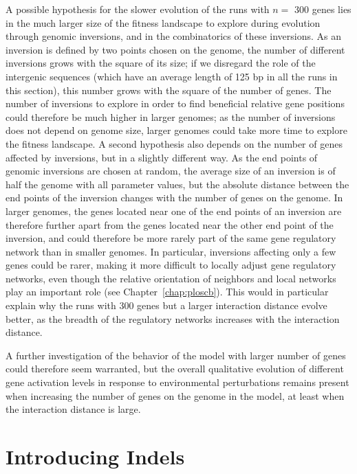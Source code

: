 A possible hypothesis for the slower evolution of the runs with $n =$ 300 genes lies in the much larger size of the fitness landscape to explore during evolution through genomic inversions, and in the combinatorics of these inversions.
As an inversion is defined by two points chosen on the genome, the number of different inversions grows with the square of its size; if we disregard the role of the intergenic sequences (which have an average length of 125 bp in all the runs in this section), this number grows with the square of the number of genes.
The number of inversions to explore in order to find beneficial relative gene positions could therefore be much higher in larger genomes; as the number of inversions does not depend on genome size, larger genomes could take more time to explore the fitness landscape.
A second hypothesis also depends on the number of genes affected by inversions, but in a slightly different way.
As the end points of genomic inversions are chosen at random, the average size of an inversion is of half the genome with all parameter values, but the absolute distance between the end points of the inversion changes with the number of genes on the genome.
In larger genomes, the genes located near one of the end points of an inversion are therefore further apart from the genes located near the other end point of the inversion, and could therefore be more rarely part of the same gene regulatory network than in smaller genomes.
In particular, inversions affecting only a few genes could be rarer, making it more difficult to locally adjust gene regulatory networks, even though the relative orientation of neighbors and local networks play an important role (see Chapter~\ref{chap:ploscb}).
This would in particular explain why the runs with 300 genes but a larger interaction distance evolve better, as the breadth of the regulatory networks increases with the interaction distance.

A further investigation of the behavior of the model with larger number of genes could therefore seem warranted, but the overall qualitative evolution of different gene activation levels in response to environmental perturbations remains present when increasing the number of genes on the genome in the model, at least when the interaction distance is large.


\section{Introducing Indels}
\label{sec:param:evolve-intergene}

